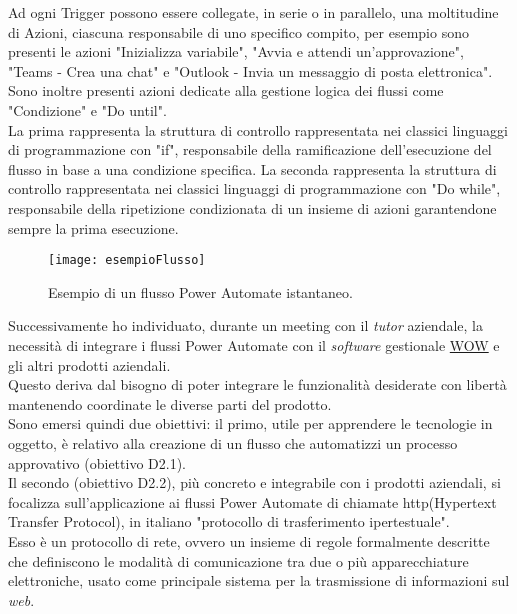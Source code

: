 \noindent Ad ogni Trigger possono essere collegate, in serie o in parallelo, una moltitudine di Azioni, ciascuna responsabile di uno specifico compito, per esempio sono presenti le azioni "Inizializza variabile", "Avvia e attendi un'approvazione", "Teams - Crea una chat" e "Outlook - Invia un messaggio di posta elettronica".\\
Sono inoltre presenti azioni dedicate alla gestione logica dei flussi come "Condizione" e "Do until".\\
La prima rappresenta la struttura di controllo rappresentata nei classici linguaggi di programmazione con "if", responsabile della ramificazione dell'esecuzione del flusso in base a una condizione specifica.
La seconda rappresenta la struttura di controllo rappresentata nei classici linguaggi di programmazione con "Do while", responsabile della ripetizione condizionata di un insieme di azioni garantendone sempre la prima esecuzione.
\begin{figure}[htbp] 
    \centering 
    \texttt{[image: esempioFlusso]} 
    \caption{Esempio di un flusso Power Automate istantaneo.}
    \label{fig:esempioFlusso}
\end{figure}
\newline \noindent Successivamente ho individuato, durante un meeting con il \emph{tutor} aziendale, la necessità di integrare i flussi Power Automate con il \emph{software} gestionale \hyperref[WOW]{WOW} e gli altri prodotti aziendali.\\
Questo deriva dal bisogno di poter integrare le funzionalità desiderate con libertà mantenendo coordinate le diverse parti del prodotto.\\
Sono emersi quindi due obiettivi: il primo, utile per apprendere le tecnologie in oggetto, è relativo alla creazione di un flusso che automatizzi un processo approvativo (obiettivo D2.1).\\
Il secondo (obiettivo D2.2), più concreto e integrabile con i prodotti aziendali, si focalizza sull'applicazione ai flussi Power Automate di chiamate \gls{http}(Hypertext Transfer Protocol), in italiano "protocollo di trasferimento ipertestuale".\\
Esso è un protocollo di rete, ovvero un insieme di regole formalmente descritte che definiscono le modalità di comunicazione tra due o più apparecchiature elettroniche, usato come principale sistema per la trasmissione di informazioni sul \emph{web}.

